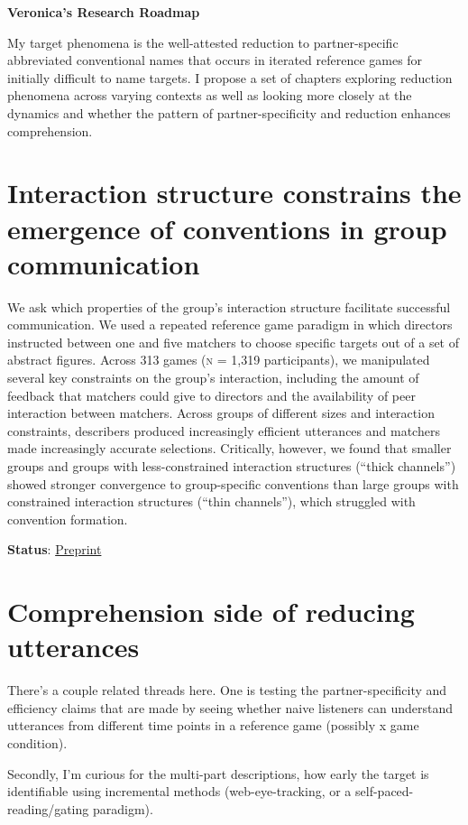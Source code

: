 \documentclass[]{article}
\begin{document}
\begin{center}
\Large \textbf{Veronica's Research Roadmap}
\end{center}

My target phenomena is the well-attested reduction to partner-specific abbreviated conventional names that occurs in iterated reference games for initially difficult to name targets. I propose a set of chapters exploring reduction phenomena across varying contexts as well as looking more closely at the dynamics and whether the pattern of partner-specificity and reduction enhances comprehension. 

\section{Interaction structure constrains the emergence of conventions in group communication}
We ask which properties of the group’s interaction structure facilitate
successful communication. We used a repeated reference game paradigm in which directors
instructed between one and five matchers to choose specific targets out of a set of abstract
figures. Across 313 games (\textsc{n} = 1,319 participants), we manipulated several key constraints on
the group’s interaction, including the amount of feedback that matchers could give to directors
and the availability of peer interaction between matchers. Across groups of different sizes and
interaction constraints, describers produced increasingly efficient utterances and matchers made
increasingly accurate selections. Critically, however, we found that smaller groups and groups
with less-constrained interaction structures (“thick channels”) showed stronger convergence
to group-specific conventions than large groups with constrained interaction structures (“thin
channels”), which struggled with convention formation. 

\textbf{Status}: \href{https://osf.io/preprints/psyarxiv/a3wfy}{Preprint}



\section{Comprehension side of reducing utterances}
There's a couple related threads here. One is testing the partner-specificity and efficiency claims that are made by seeing whether naive listeners can understand utterances from different time points in a reference game (possibly x game condition). 

Secondly, I'm curious for the multi-part descriptions, how early the target is identifiable using incremental methods (web-eye-tracking, or a self-paced-reading/gating paradigm). 
\end{document}
